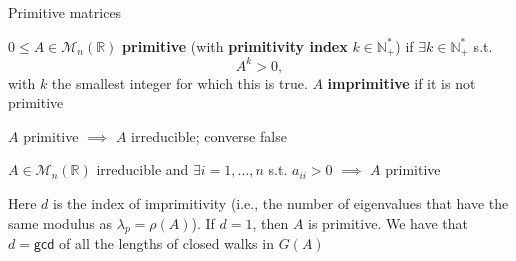 \documentclass[aspectratio=43]{beamer}
\def\IN{\mathbb{N}}
\def\IR{\mathbb{R}}
\def\M{\mathcal{M}}
\begin{document}
\begin{frame}{Primitive matrices}
\begin{definition}
$0\leq A\in\M_n(\IR)$ \textbf{primitive} (with \textbf{primitivity index} $k\in \IN_{+}^{*}$) if $\exists k\in \IN_{+}^{*}$ s.t.
\[
A^k>0,
\]
with $k$ the smallest integer for which this is true.
$A$ \textbf{imprimitive} if it is not primitive
\end{definition}
\vfill
$A$ primitive $\implies$ $A$ irreducible; converse false
\vfill
\begin{theorem}
	$A\in\M_n(\IR)$ irreducible and $\exists i=1,\ldots,n$ s.t. $a_{ii}>0$ $\implies$ $A$ primitive
\end{theorem}
\vfill
Here $d$ is the index of imprimitivity (i.e., the number of eigenvalues that have the same modulus as $\lambda_p=\rho(A)$). If $d=1$, then $A$ is primitive. We have that $d=\mathsf{gcd}$ of all the lengths of closed walks in $G(A)$
\end{frame}
\end{document}
